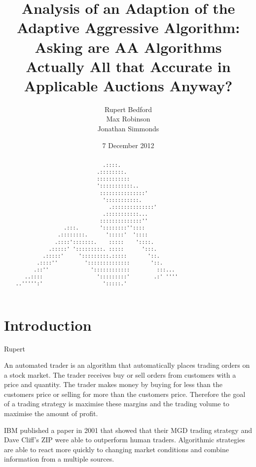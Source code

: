 \documentclass{acm_proc_article-sp}
\begin{document}
\title{Analysis of an Adaption of the Adaptive Aggressive Algorithm: Asking are AA Algorithms Actually All that Accurate in Applicable Auctions Anyway?}
\author{
  \alignauthor
    Rupert Bedford\\
  \alignauthor
    Max Robinson\\
  \alignauthor
    Jonathan Simmonds
}
\date{7 December 2012}

\maketitle
\begin{abstract} \label{sec:abstract}
\begin{verbatim}
                             .::::. 
                           .::::::::. 
                           ::::::::::: 
                           ':::::::::::.. 
                            :::::::::::::::' 
                             ':::::::::::. 
                               .::::::::::::::' 
                             .:::::::::::... 
                            ::::::::::::::'' 
                .:::.       '::::::::'':::: 
              .::::::::.      ':::::'  ':::: 
             .::::':::::::.    :::::    '::::. 
           .:::::' ':::::::::. :::::      ':::. 
         .:::::'     ':::::::::.:::::       '::. 
       .::::''         '::::::::::::::       '::. 
      .::''              '::::::::::::         :::... 
   ..::::                  ':::::::::'        .:' '''' 
..''''':'                    ':::::.' 
\end{verbatim}
\end{abstract}

\pagebreak

\section{Introduction} \label{sec:introduction}
Rupert

An automated trader is an algorithm that automatically places trading orders on
a stock market.
The trader receives buy or sell orders from customers with a price and
quantity.
The trader makes money by buying for less than the customers price or selling
for more than the customers price.
Therefore the goal of a trading strategy is maximise these margins and the
trading volume to maximise the amount of profit.

IBM published a paper in 2001 that showed that their MGD trading strategy and
Dave Cliff's ZIP were able to outperform human traders.
Algorithmic strategies are able to react more quickly to changing market
conditions and combine information from a multiple sources.
\end{document}
